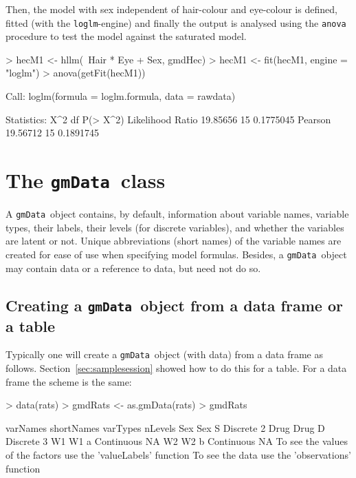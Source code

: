 \documentclass{article}
\def\code#1{\texttt{#1}}
\def\gmData            {\code{gmData}}
\def\gmData             {\code{gmData}}
\begin{document}
Then, the model with sex independent of hair-colour and eye-colour is
defined, fitted (with the \code{loglm}-engine) and finally the output
is analysed using the \code{anova} procedure to test the model against
the saturated model.

\footnotesize
\begin{Schunk}
\begin{Sinput}
> hecM1 <- hllm(~Hair * Eye + Sex, gmdHec)
> hecM1 <- fit(hecM1, engine = "loglm")
> anova(getFit(hecM1))
\end{Sinput}
\begin{Soutput}
Call:
loglm(formula = loglm.formula, data = rawdata)

Statistics:
                      X^2 df  P(> X^2)
Likelihood Ratio 19.85656 15 0.1775045
Pearson          19.56712 15 0.1891745
\end{Soutput}
\end{Schunk}
\normalsize

\section[The gmData class]{The \protect\gmData\ class}
\label{sec:gmData}

A \gmData\ object contains, by default, information about variable
names, variable types, their labels, their levels (for discrete
variables), and whether the variables are latent or not. Unique
abbreviations (short names) of the variable names are created for ease
of use when specifying model formulas. Besides, a \gmData\ object may
contain data or a reference to data, but need not do so.

\subsection[Creating a gmData object from a data frame or a table]%
{Creating a \protect\gmData\ object from a data frame or a table}


Typically one will create a \gmData\ object (with data) from a data
frame as follows. Section~\ref{sec:samplesession} showed how to do
this for a table. For a data frame the scheme is the same:

\footnotesize
\begin{Schunk}
\begin{Sinput}
> data(rats)
> gmdRats <- as.gmData(rats)
> gmdRats
\end{Sinput}
\begin{Soutput}
     varNames shortNames   varTypes nLevels
Sex       Sex          S   Discrete       2
Drug     Drug          D   Discrete       3
W1         W1          a Continuous      NA
W2         W2          b Continuous      NA
To see the values of the factors use the 'valueLabels' function
To see the data use the 'observations' function
\end{Soutput}
\end{Schunk}
\normalsize
\end{document}
